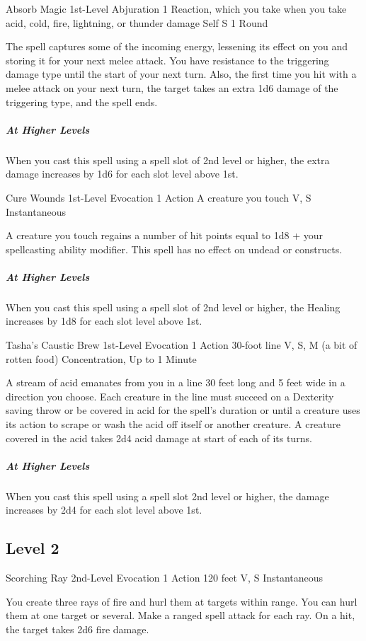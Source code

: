 {\DndSpellHeader
  {Absorb Magic}
  {1st-Level Abjuration}
  {1 Reaction, which you take when you take acid, cold, fire, lightning, or thunder damage}
  {Self}
  {S}
  {1 Round}
  
The spell captures some of the incoming energy, lessening its effect on you and storing it for your next melee attack. You have resistance to the triggering damage type until the start of your next turn. Also, the first time you hit with a melee attack on your next turn, the target takes an extra 1d6 damage of the triggering type, and the spell ends.

\subparagraph*{At Higher Levels} When you cast this spell using a spell slot of 2nd level or higher, the extra damage increases by 1d6 for each slot level above 1st.

\DndSpellHeader
  {Cure Wounds}
  {1st-Level Evocation}
  {1 Action}
  {A creature you touch}
  {V, S}
  {Instantaneous}
  
A creature you touch regains a number of hit points equal to 1d8 + your spellcasting ability modifier. This spell has no effect on undead or constructs.

\subparagraph*{At Higher Levels} When you cast this spell using a spell slot of 2nd level or higher, the Healing increases by 1d8 for each slot level above 1st.

\DndSpellHeader
  {Tasha's Caustic Brew}
  {1st-Level Evocation}
  {1 Action}
  {30-foot line}
  {V, S, M (a bit of rotten food)}
  {Concentration, Up to 1 Minute}
  
A stream of acid emanates from you in a line 30 feet long and 5 feet wide in a direction you choose. Each creature in the line must succeed on a Dexterity saving throw or be covered in acid for the spell’s duration or until a creature uses its action to scrape or wash the acid off itself or another creature. A creature covered in the acid takes 2d4 acid damage at start of each of its turns.

\subparagraph*{At Higher Levels} When you cast this spell using a spell slot 2nd level or higher, the damage increases by 2d4 for each slot level above 1st.

\subsection*{Level 2}

\DndSpellHeader
  {Scorching Ray}
  {2nd-Level Evocation}
  {1 Action}
  {120 feet}
  {V, S}
  {Instantaneous}
  
You create three rays of fire and hurl them at targets within range. You can hurl them at one target or several. Make a ranged spell attack for each ray. On a hit, the target takes 2d6 fire damage.

}
